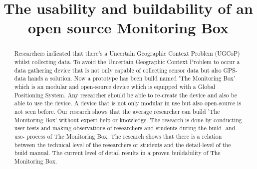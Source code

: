 \documentclass[conference]{IEEEtran}
\begin{document}
\title{The usability and buildability of an open source Monitoring Box}

\author{
	\and
		\and
		}
\maketitle	

\begin{abstract}
Researchers indicated that there's a Uncertain Geographic Context Problem (UGCoP) \cite{kwan2012uncertain} whilst collecting data. To avoid the Uncertain Geographic Context Problem to occur a data gathering device that is not only capable of collecting sensor data but also GPS-data hands a solution. Now a prototype has been build named 'The Monitoring Box' which is an modular and open-source device which is equipped with a Global Positioning System. Any researcher should be able to re-create the device and also be able to use the device. A device that is not only modular in use but also open-source is not seen before. Our research shows that the average researcher can build 'The Monitoring Box' without expert help or knowledge. The research is done by conducting user-tests and making observations of researchers and students during the build- and use- process of The Monitoring Box. The research shows that there is a relation between the technical level of the researchers or students and the detail-level of the build manual. The current level of detail results in a proven buildability of The Monitoring Box.\\

\end{abstract}
\end{document}
